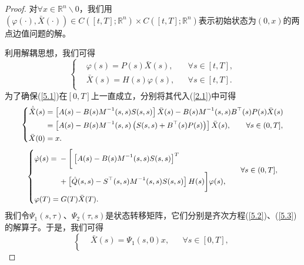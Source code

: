 \documentclass{GZUbachelorthesis}
\begin{document}
\begin{proof}
	对${\forall x\in\mathbb{R}^n\backslash0}$，我们用${(\varphi(\cdot),\bar{X}(\cdot))\in C([t,T];\mathbb{R}^n)\times C([t,T];\mathbb{R}^n)}$表示初始状态为${(0,x)}$的两点边值问题的解。\par
	利用解耦思想，我们可得
	\begin{equation}\label{5.1}
		{
			\left\{
			\begin{aligned}
				&\varphi(s)=P(s)\bar{X}(s), &&\forall s\in [t,T],\\[8pt]
				&\bar{X}(s)=H(s)\varphi(s), &&\forall s\in [t,T].\\[8pt]
			\end{aligned}
			\right.
		}
	\end{equation}
	为了确保(\ref{5.1})在${[0,T]}$上一直成立，分别将其代入(\ref{2.1})中可得
	\begin{equation}\label{5.2}
		{
			{\small
				\left\{
				\begin{aligned}
					\dot{\bar{X}}(s)&=\left[A(s)-B(s)M^{-1}(s,s)S(s,s)\right]\bar{X}(s) -B(s)M^{-1}(s,s)B^\top(s)P(s)\bar{X}(s)\\
					&=\left[A(s)-B(s)M^{-1}(s,s)\left(S(s,s)+B^\top(s)P(s)\right)\right]\bar{X}(s),
					\quad\quad \forall s\in(0,T],\\
					\bar{X}(0)&=x.
				\end{aligned}
				\right.}
		}
	\end{equation}
	\begin{equation}\label{5.3}
		{
			{\small
				\left\{
				\begin{aligned}
					&\begin{aligned}
						\dot{\varphi}(s) ={} & -\bigg[\left[A(s)-B(s)M^{-1}(s,s)S(s,s)\right]^{T} \\
						& +\left[\hat{Q}(s,s)-S^\top(s,s)M^{-1}(s,s)S(s,s)\right] H(s)\bigg]\varphi(s),
					\end{aligned} \quad\quad \forall s\in(0,T],\\
					&\varphi(T)=G(T)\bar{X}(T).\\
				\end{aligned}
				\right.}
		}
	\end{equation}
	我们令${\Psi_1(s,\tau)}$、${\Psi_2(\tau,s)}$是状态转移矩阵，它们分别是齐次方程(\ref{5.2})、(\ref{5.3})的解算子。于是，我们可得
	\begin{equation}\label{5.4}
		{
			{
				\left\{
				\begin{aligned}
					&\bar{X}(s)=\Psi_1(s,0)x,&&\forall s\in[0,T],\\[8pt]

\end{aligned}}}
\end{equation}
\end{proof}
\end{document}
